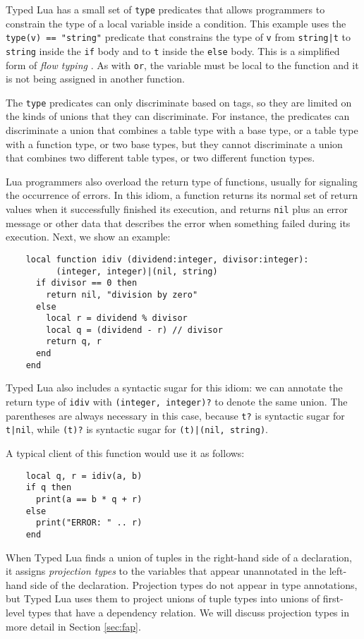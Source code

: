 Typed Lua has a small set of \texttt{type} predicates that allows
programmers to constrain the type of a local variable inside a condition.
This example uses the \texttt{type(v) == "string"} predicate that
constrains the type of \texttt{v} from \texttt{string|t} to
\texttt{string} inside the \texttt{if} body and to \texttt{t}
inside the \texttt{else} body.
This is a simplified form of \emph{flow typing} \citep{guha2011tlc,tobin-hochstadt2010ltu}.
As with \texttt{or}, the variable must be local to the function
and it is not being assigned in another function.

The \texttt{type} predicates can only discriminate based on tags,
so they are limited on the kinds of unions that they can discriminate.
For instance, the predicates can discriminate a union that combines
a table type with a base type, or a table type with a function type,
or two base types, but they cannot discriminate a union that combines
two different table types, or two different function types.

Lua programmers also overload the return type of functions,
usually for signaling the occurrence of errors.
In this idiom, a function returns its normal set of return values
when it successfully finished its execution,
and returns \texttt{nil} plus an error message or other data that
describes the error when something failed during its execution.
Next, we show an example:
\begin{verbatim}
    local function idiv (dividend:integer, divisor:integer):
          (integer, integer)|(nil, string)
      if divisor == 0 then
        return nil, "division by zero"
      else
        local r = dividend % divisor
        local q = (dividend - r) // divisor
        return q, r
      end 
    end
\end{verbatim}

Typed Lua also includes a syntactic sugar for this idiom:
we can annotate the return type of \texttt{idiv} with
\texttt{(integer, integer)?} to denote the same union.
The parentheses are always necessary in this case, because
\texttt{t?} is syntactic sugar for \texttt{t|nil},
while \texttt{(t)?} is syntactic sugar for \texttt{(t)|(nil, string)}.

A typical client of this function would use it as follows:
\begin{verbatim}
    local q, r = idiv(a, b)
    if q then
      print(a == b * q + r)
    else
      print("ERROR: " .. r)
    end
\end{verbatim}

When Typed Lua finds a union of tuples in the right-hand side of
a declaration, it assigns \emph{projection types} to the
variables that appear unannotated in the left-hand side of the
declaration.
Projection types do not appear in type annotations, but Typed Lua
uses them to project unions of tuple types into unions of
first-level types that have a dependency relation.
We will discuss projection types in more detail in Section \ref{sec:fap}.

